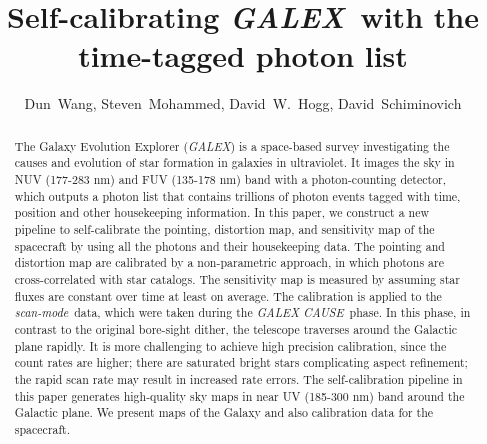 \documentclass[12pt, preprint]{aastex61}
\newcommand{\project}[1]{\textsl{#1}}
\newcommand{\galex}{\project{GALEX}}
\newcommand{\cause}{\project{GALEX CAUSE}}
\newcommand{\scanmode}{\project{scan-mode}}
\begin{document}
\title{Self-calibrating \galex\ with the time-tagged photon list}
\author{%
  Dun~Wang\altaffilmark{\ref{CCPP}},
  Steven~Mohammed\altaffilmark{\ref{CU}},
  David~W.~Hogg\altaffilmark{\ref{CCPP},\ref{CDS},\ref{MPIA},\ref{CCA}},
  David~Schiminovich\altaffilmark{\ref{CU}}
  }
\setcounter{address}{1}

\begin{abstract}
The Galaxy Evolution Explorer (\galex) is a space-based survey investigating the causes and evolution of star formation in galaxies in ultraviolet. 
It images the sky in NUV (177-283 nm) and FUV (135-178 nm) band with a photon-counting detector, which outputs a photon list that contains trillions of photon events tagged with time, position and other housekeeping information.
In this paper, we construct a new pipeline to self-calibrate the pointing,  distortion map, and sensitivity map of the spacecraft by using all the photons and their housekeeping data.
The pointing and distortion map are calibrated by a non-parametric approach, in which photons are cross-correlated with star catalogs.
The sensitivity map is measured by assuming star fluxes are constant over time at least on average.
The calibration is applied to the \scanmode\ data, which were taken during the \cause\ phase.
In this phase, in contrast to the original bore-sight dither, the telescope traverses around the Galactic plane rapidly. 
It is more challenging to achieve high precision calibration, since the count rates are higher; there are saturated bright stars complicating aspect refinement; the rapid scan rate may result in increased rate errors.
The self-calibration pipeline in this paper generates high-quality sky maps in near UV (185-300 nm) band around the Galactic plane.
We present maps of the Galaxy and also calibration data for the spacecraft.

\end{abstract}
\end{document}
